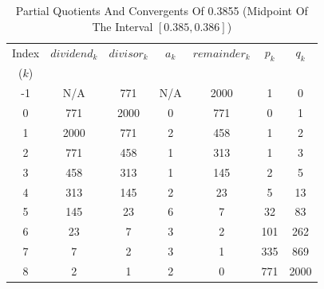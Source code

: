 \documentclass{esub2acm}
\begin{document}
\begin{table}
\caption{Partial Quotients And Convergents Of 0.3855 (Midpoint Of The Interval
        $[0.385, 0.386]$)}
\label{tbl:cfexpansmidpoint}
\begin{center}
\begin{tabular}{|c|c|c|c|c|c|c|}
\hline
\small{Index} & \small{$dividend_k$}  & \small{$divisor_k$} & \small{$a_k$}   & \small{$remainder_k$} & \small{$p_k$}      & \small{$q_k$}       \\
\small{($k$)} &                       &                     &                 &                       &                    &                     \\
\hline
\hline
\small{-1}    & \small{N/A}           & \small{771}         & \small{N/A}     & \small{2000}          & \small{1}          & \small{0}           \\
\hline
\small{0}     & \small{771}           & \small{2000}        & \small{0}       & \small{771}           & \small{0}          & \small{1}           \\
\hline
\small{1}     & \small{2000}          & \small{771}         & \small{2}       & \small{458}           & \small{1}          & \small{2}           \\
\hline
\small{2}     & \small{771}           & \small{458}         & \small{1}       & \small{313}           & \small{1}          & \small{3}           \\
\hline
\small{3}     & \small{458}           & \small{313}         & \small{1}       & \small{145}           & \small{2}          & \small{5}           \\
\hline
\small{4}     & \small{313}           & \small{145}         & \small{2}       & \small{23}            & \small{5}          & \small{13}          \\
\hline
\small{5}     & \small{145}           & \small{23}          & \small{6}       & \small{7}             & \small{32}         & \small{83}          \\
\hline
\small{6}     & \small{23}            & \small{7}           & \small{3}       & \small{2}             & \small{101}        & \small{262}         \\
\hline
\small{7}     & \small{7}             & \small{2}           & \small{3}       & \small{1}             & \small{335}        & \small{869}         \\
\hline
\small{8}     & \small{2}             & \small{1}           & \small{2}       & \small{0}             & \small{771}        & \small{2000}        \\
\hline
\end{tabular}
\end{center}
\end{table}
\end{document}

